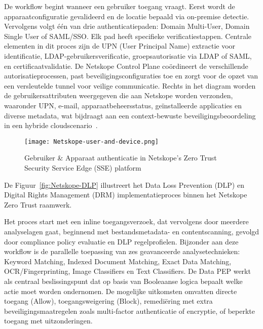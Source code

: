 De workflow begint wanneer een gebruiker toegang vraagt. Eerst wordt de apparaatconfiguratie gevalideerd en de locatie bepaald via on-premise detectie. Vervolgens volgt één van drie authenticatiepaden: Domain Multi-User, Domain Single User of SAML/SSO. Elk pad heeft specifieke verificatiestappen. Centrale elementen in dit proces zijn de UPN (User Principal Name) extractie voor identificatie, LDAP-gebruikersverificatie, groepsautorisatie via LDAP of SAML, en certificaatvalidatie. De Netskope Control Plane coördineert de verschillende autorisatieprocessen, past beveiligingsconfiguraties toe en zorgt voor de opzet van een versleutelde tunnel voor veilige communicatie. Rechts in het diagram worden de gebruikersattributen weergegeven die aan Netskope worden verzonden, waaronder UPN, e-mail, apparaatbeheersstatus, geïnstalleerde applicaties en diverse metadata, wat bijdraagt aan een context-bewuste beveiligingsbeoordeling in een hybride cloudscenario~\autocite{Netskope2024}.
\begin{figure}[H]
  \centering
  \texttt{[image: Netskope-user-and-device.png]}
  \caption[Netskope Gebruiker \& Apparaat authenticatie]{Gebruiker \& Apparaat authenticatie in Netskope's Zero Trust Security Service Edge (SSE) platform~\autocite{Netskope2024}}
  \label{fig:Netskope-user-and-device}
\end{figure}

De Figuur~\ref{fig:Netskope-DLP} illustreert het Data Loss Prevention (DLP) en Digital Rights Management (DRM) implementatieproces binnen het Netskope Zero Trust raamwerk. 

\vspace{2ex}

Het proces start met een inline toegangsverzoek, dat vervolgens door meerdere analyselagen gaat, beginnend met bestandsmetadata- en contentscanning, gevolgd door compliance policy evaluatie en DLP regelprofielen. Bijzonder aan deze workflow is de parallelle toepassing van zes geavanceerde analysetechnieken: Keyword Matching, Indexed Document Matching, Exact Data Matching, OCR/Fingerprinting, Image Classifiers en Text Classifiers. De Data PEP werkt als centraal beslissingspunt dat op basis van Booleaanse logica bepaalt welke actie moet worden ondernomen. De mogelijke uitkomsten omvatten directe toegang (Allow), toegangsweigering (Block), remediëring met extra beveiligingsmaatregelen zoals multi-factor authenticatie of encryptie, of beperkte toegang met uitzonderingen. 

\vspace{2ex}

